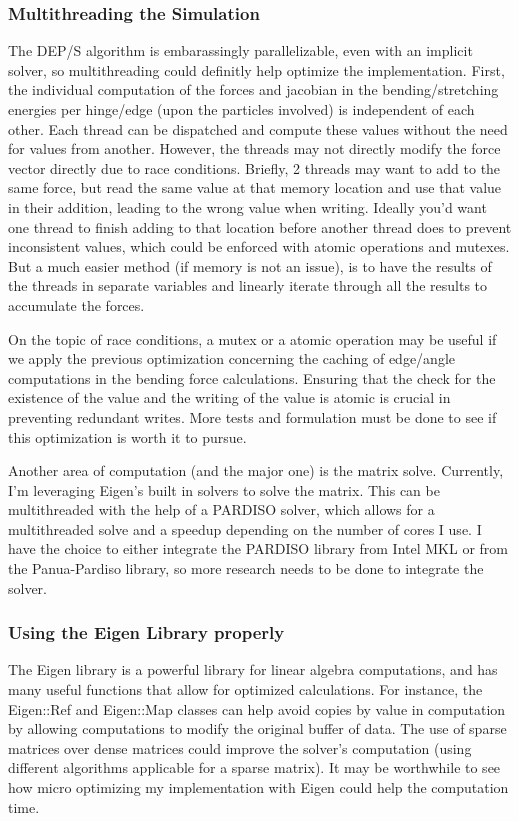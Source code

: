 \documentclass[letterpaper, 10 pt, conference]{ieeeconf}  %
\begin{document}
        \subsubsection{Multithreading the Simulation}
        The DEP/S algorithm is embarassingly parallelizable, even with an implicit solver, so multithreading could definitly help optimize the implementation. First, the individual computation of the forces and jacobian in the bending/stretching energies per hinge/edge (upon the particles involved) is independent of each other. Each thread can be dispatched and  compute these values without the need for values from another. However, the threads may not directly modify the force vector directly due to race conditions. Briefly, 2 threads may want to add to the same force, but read the same value at that memory location and use that value in their addition, leading to the wrong value when writing. Ideally you'd want one thread to finish adding to that location before another thread does to prevent inconsistent values, which could be enforced with atomic operations and mutexes. But a much easier method (if memory is not an issue), is to have the results of the threads in separate variables and linearly iterate through all the results to accumulate the forces.

        On the topic of race conditions, a mutex or a atomic operation may be useful if we apply the previous optimization concerning the caching of edge/angle computations in the bending force calculations. Ensuring that the check for the existence of the value and the writing of the value is atomic is crucial in preventing redundant writes. More tests and formulation must be done to see if this optimization is worth it to pursue.

        Another area of computation (and the major one) is the matrix solve. Currently, I'm leveraging Eigen's built in solvers to solve the matrix. This can be multithreaded with the help of a PARDISO solver\cite{SCHENK200169}, which allows for a multithreaded solve and a speedup depending on the number of cores I use. I have the choice to either integrate the PARDISO library from Intel MKL or from the Panua-Pardiso library, so more research needs to be done to integrate the solver.

        \subsubsection{Using the Eigen Library properly}
        The Eigen library is a powerful library for linear algebra computations, and has many useful functions that allow for optimized calculations. For instance, the Eigen::Ref and Eigen::Map classes can help avoid copies by value in computation by allowing computations to modify the original buffer of data. The use of sparse matrices over dense matrices could improve the solver's computation (using different algorithms applicable for a sparse matrix). It may be worthwhile to see how micro optimizing my implementation with Eigen could help the computation time.
\end{document}
